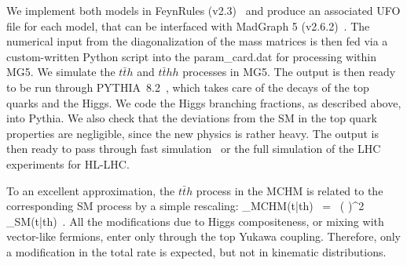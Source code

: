 \label{mg}
We implement both models in FeynRules
(v2.3)~\cite{Alloul:2013bka} and produce an associated UFO file for
each model, that can be interfaced with MadGraph 5
(v2.6.2)~\cite{Alwall:2014hca}.  The numerical input from the
diagonalization of the mass matrices is then fed via a custom-written
Python script into the param\_card.dat for processing within MG5.  We
simulate the ${t\bar t} h$ and ${t\bar t} hh$ processes in MG5.  The 
output is then ready to be run through PYTHIA~8.2~\cite{Sjostrand:2014zea}, which
takes care of the decays of the top quarks and the Higgs.  We code the
Higgs branching fractions, as described above,
into Pythia.  We also check that the deviations from the SM in
the top quark properties are negligible, since the new physics is
rather heavy.  The output is then ready to pass through fast 
simulation~\cite{deFavereau:2013fsa} or the full simulation of the LHC experiments for HL-LHC.

\label{tth}
To an excellent approximation, the $t\bar{t} h$ process in the MCHM
is related to the corresponding SM process by a simple rescaling:
%
\be
\sigma_{\rm MCHM}(t\bar{t}h) ~=~ \left(  \right)^2 \, \sigma_{\rm SM}(t\bar{t}h)~.
\label{sigmatth}
\ee
%
All the modifications due to Higgs compositeness, or mixing with
vector-like fermions, enter only through the top Yukawa coupling.
Therefore, only a modification in the total rate is expected, but not
in kinematic distributions.

